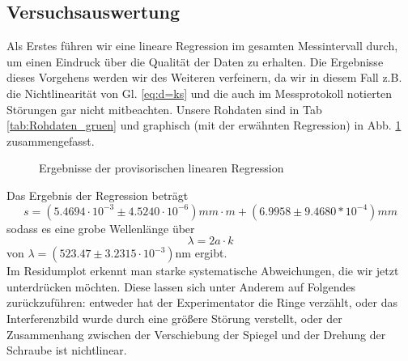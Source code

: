 \documentclass[12pt,a4paper]{article}
\begin{document}
\subsection{Versuchsauswertung}
Als Erstes führen wir eine lineare Regression im gesamten Messintervall durch, um einen Eindruck über die Qualität der Daten zu erhalten. Die Ergebnisse dieses Vorgehens werden wir des Weiteren verfeinern, da wir in diesem Fall z.B. die Nichtlinearität von Gl. \ref{eq:d=ks} und die auch im Messprotokoll notierten Störungen gar nicht mitbeachten. Unsere Rohdaten sind in Tab \ref{tab:Rohdaten_gruen} und graphisch (mit der erwähnten Regression) in Abb. \ref{fig:lambdarohlinreg} zusammengefasst.
\begin{figure}[H]
	\centering
	\qquad
	\caption{Ergebnisse der provisorischen linearen Regression}
	\label{fig:lambdarohlinreg}
\end{figure}
Das Ergebnis der Regression beträgt
\begin{equation*}
s = (5.4694\cdot10^{-3}\pm4.5240\cdot10^{-6})mm\cdot m+(6.9958\pm9.4680*10^{-4})mm
\end{equation*}
sodass es eine grobe Wellenlänge über
\begin{equation}
	\lambda = 2a\cdot k
	\label{eq:l=2ak}
\end{equation}
von $\lambda=(523.47\pm3.2315\cdot10^{-3})$nm ergibt.\\
Im Residumplot erkennt man starke systematische Abweichungen, die wir jetzt unterdrücken möchten. Diese lassen sich unter Anderem auf Folgendes zurückzuführen: entweder hat der Experimentator die Ringe verzählt, oder das Interferenzbild wurde durch eine größere Störung verstellt, oder der Zusammenhang zwischen der Verschiebung der Spiegel und der Drehung der Schraube ist nichtlinear.\\
\end{document}

